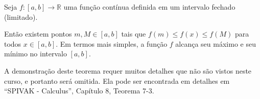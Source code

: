 \begin{theorem}
	Seja $f\colon [a,b]\to\mathbb{R}$ uma função contínua definida em um intervalo fechado (limitado).
	
	Então existem pontos $m,M\in[a,b]$ tais que $f(m)\leq f(x)\leq f(M)$ para todos $x\in [a,b]$. Em termos mais simples, a função $f$ alcança seu máximo e seu mínimo no intervalo $[a,b]$.
\end{theorem}

A demonstração deste teorema requer muitos detalhes que não são vistos neste curso, e portanto será omitida. Ela pode ser encontrada em detalhes em ``SPIVAK - Calculus'', Capítulo 8, Teorema 7-3.